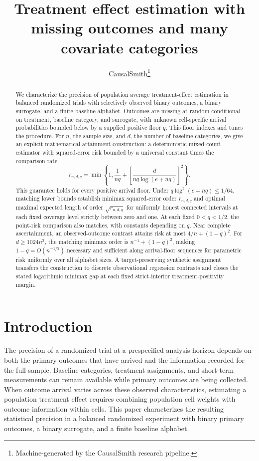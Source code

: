 \documentclass[11pt]{article}
\title{Treatment effect estimation with missing outcomes and many covariate categories}
\author{CausalSmith\thanks{Machine-generated by the CausalSmith research pipeline.}}
\date{\cspaperdate}
\begin{document}
\maketitle

\begin{abstract}
We characterize the precision of population average treatment-effect estimation in balanced randomized trials with selectively observed binary outcomes, a binary surrogate, and a finite baseline alphabet. Outcomes are missing at random conditional on treatment, baseline category, and surrogate, with unknown cell-specific arrival probabilities bounded below by a supplied positive floor \(q\). This floor indexes and tunes the procedure. For \(n\), the sample size, and \(d\), the number of baseline categories, we give an explicit mathematical attainment construction: a deterministic mixed-count estimator with squared-error risk bounded by a universal constant times the comparison rate
\[
r_{n,d,q}
=
\min\left\{1,\frac{1}{nq}
+\left[\frac{d}{nq\log(e+nq)}\right]^2\right\}.
\]
This guarantee holds for every positive arrival floor. Under \(q\log^2(e+nq)\le1/64\), matching lower bounds establish minimax squared-error order \(r_{n,d,q}\) and optimal maximal expected length of order \(\sqrt{r_{n,d,q}}\) for uniformly honest connected intervals at each fixed coverage level strictly between zero and one. At each fixed \(0<q<1/2\), the point-risk comparison also matches, with constants depending on \(q\). Near complete ascertainment, an observed-outcome contrast attains risk at most \(4/n+(1-q)^2\). For \(d\ge1024n^2\), the matching minimax order is \(n^{-1}+(1-q)^2\), making \(1-q=O(n^{-1/2})\) necessary and sufficient along arrival-floor sequences for parametric risk uniformly over all alphabet sizes. A target-preserving synthetic assignment transfers the construction to discrete observational regression contrasts and closes the stated logarithmic minimax gap at each fixed strict-interior treatment-positivity margin.
\end{abstract}

\section{Introduction}

The precision of a randomized trial at a prespecified analysis horizon depends on both the primary outcomes that have arrived and the information recorded for the full sample. Baseline categories, treatment assignments, and short-term measurements can remain available while primary outcomes are being collected. When outcome arrival varies across these observed characteristics, estimating a population treatment effect requires combining population cell weights with outcome information within cells. This paper characterizes the resulting statistical precision in a balanced randomized experiment with binary primary outcomes, a binary surrogate, and a finite baseline alphabet.
\end{document}

